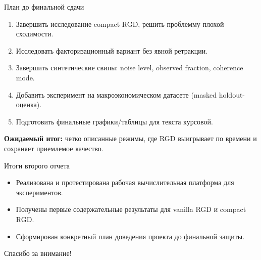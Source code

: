 \documentclass[aspectratio=169,xcolor=dvipsnames]{beamer}
\begin{document}
\begin{frame}{План до финальной сдачи}
    \small
    \begin{enumerate}
        \item Завершить исследование compact RGD, решить проблемму плохой сходимости.
        \item Исследовать факторизационный вариант без явной ретракции.
        \item Завершить синтетические свипы: noise level, observed fraction, coherence mode.
        \item Добавить эксперимент на макроэкономическом датасете (masked holdout-оценка).
        \item Подготовить финальные графики/таблицы для текста курсовой.
    \end{enumerate}
    \vspace{0.3cm}
    \textbf{Ожидаемый итог:} четко описанные режимы, где RGD выигрывает по времени и сохраняет приемлемое качество.
\end{frame}

\begin{frame}{Итоги второго отчета}
    \small
    \begin{itemize}
        \item Реализована и протестирована рабочая вычислительная платформа для экспериментов.
        \item Получены первые содержательные результаты для vanilla RGD и compact RGD.
        \item Сформирован конкретный план доведения проекта до финальной защиты.
    \end{itemize}
    \vspace{0.6cm}
    \centering
    \Large Спасибо за внимание!
\end{frame}
\end{document}
